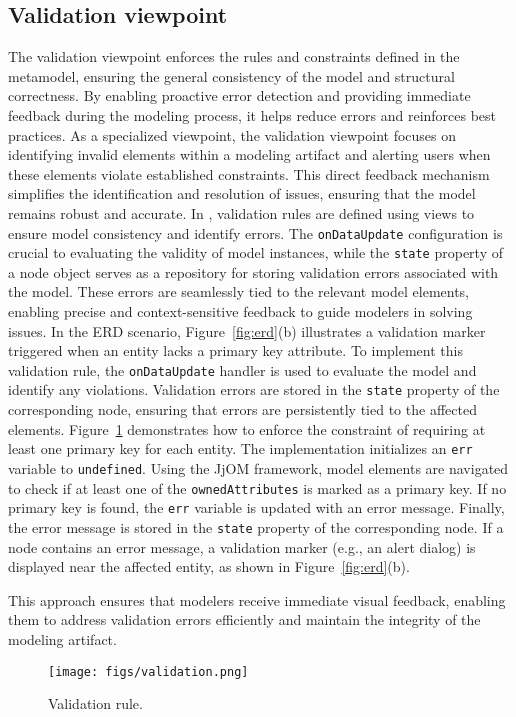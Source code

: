 \subsection{Validation viewpoint} 
The validation viewpoint enforces the rules and constraints defined in the metamodel, ensuring the general consistency of the model and structural correctness. By enabling proactive error detection and providing immediate feedback during the modeling process, it helps reduce errors and reinforces best practices.
%
As a specialized viewpoint, the validation viewpoint focuses on identifying invalid elements within a modeling artifact and alerting users when these elements violate established constraints. This direct feedback mechanism simplifies the identification and resolution of issues, ensuring that the model remains robust and accurate. In \jjodel{}, validation rules are defined using views to ensure model consistency and identify errors. The \texttt{onDataUpdate} configuration is crucial to evaluating the validity of model instances, while the \texttt{state} property of a node object serves as a repository for storing validation errors associated with the model. These errors are seamlessly tied to the relevant model elements, enabling precise and context-sensitive feedback to guide modelers in solving issues.
%
In the ERD scenario, Figure~\ref{fig:erd}(b) illustrates a validation marker triggered when an entity lacks a primary key attribute. To implement this validation rule, the \texttt{onDataUpdate} handler is used to evaluate the model and identify any violations. Validation errors are stored in the \texttt{state} property of the corresponding node, ensuring that errors are persistently tied to the affected elements.
%
Figure~\ref{fig:validation} demonstrates how to enforce the constraint of requiring at least one primary key for each entity. The implementation initializes an \texttt{err} variable to \texttt{undefined}. Using the JjOM framework, model elements are navigated to check if at least one of the \texttt{ownedAttributes} is marked as a primary key. If no primary key is found, the \texttt{err} variable is updated with an error message. Finally, the error message is stored in the \texttt{state} property of the corresponding node. If a node contains an error message, a validation marker (e.g., an alert dialog) is displayed near the affected entity, as shown in Figure~\ref{fig:erd}(b).

This approach ensures that modelers receive immediate visual feedback, enabling them to address validation errors efficiently and maintain the integrity of the modeling artifact.
\begin{figure}
    \centering
    \texttt{[image: figs/validation.png]}
    \caption{Validation rule.}
    \label{fig:validation}
\end{figure}

